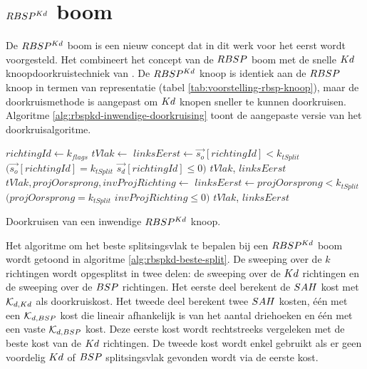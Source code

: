 \section{$RBSP^{Kd}$ boom}
\label{sec:h4-rbspkd}
De $RBSP^{Kd}$ boom is een nieuw concept dat in dit werk voor het eerst wordt voorgesteld.
Het combineert het concept van de $RBSP$ boom met de snelle $Kd$ knoopdoorkruistechniek van \authorIze{} \cite{ize}.
De $RBSP^{Kd}$ knoop is identiek aan de $RBSP$ knoop in termen van representatie (tabel \ref{tab:voorstelling-rbsp-knoop}), maar de doorkruismethode is aangepast om $Kd$ knopen sneller te kunnen doorkruisen.
Algoritme \ref{alg:rbspkd-inwendige-doorkruising} toont de aangepaste versie van het doorkruisalgoritme.\\

\begin{dutchalgorithm}
    \begin{algorithmic}       
            \State $richtingId \gets k_{flags}$
                \State $tVlak \gets $ 
                \State $linksEerst \gets \vec{s_o}[richtingId] < k_{tSplit}$ \Or $(\vec{s_o}[richtingId] = k_{tSplit}$ \And $\vec{s_d}[richtingId] \leq 0)$
                \State \Return $tVlak$, $linksEerst$
            \Else
                \State $tVlak, projOorsprong, invProjRichting \gets $ 
                 \State $linksEerst \gets projOorsprong < k_{tSplit}$ \Or $(projOorsprong = k_{tSplit}$ \And $invProjRichting \leq 0)$
                \State \Return $tVlak$, $linksEerst$
            \EndIf
        \EndFunction
    \end{algorithmic}
    \caption{Doorkruisen van een inwendige $RBSP^{Kd}$ knoop.}
    \label{alg:rbspkd-inwendige-doorkruising}
\end{dutchalgorithm}

Het algoritme om het beste splitsingsvlak te bepalen bij een $RBSP^{Kd}$ boom wordt getoond in algoritme \ref{alg:rbspkd-beste-split}.
De sweeping over de $k$ richtingen wordt opgesplitst in twee delen: de sweeping over de $Kd$ richtingen en de sweeping over de $BSP$ richtingen.
Het eerste deel berekent de $SAH$ kost met $\mathcal{K}_{d,Kd}$ als doorkruiskost.
Het tweede deel berekent twee $SAH$ kosten, één met een $\mathcal{K}_{d,BSP}$ kost die lineair afhankelijk is van het aantal driehoeken en één met een vaste $\mathcal{K}_{d,BSP}$ kost.
Deze eerste kost wordt rechtstreeks vergeleken met de beste kost van de $Kd$ richtingen.
De tweede kost wordt enkel gebruikt als er geen voordelig $Kd$ of $BSP$ splitsingsvlak gevonden wordt via de eerste kost.

